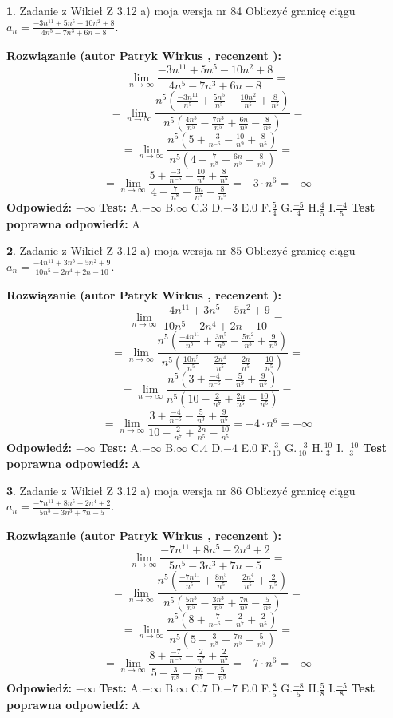 \documentclass[12pt, a4paper]{article}
\theoremstyle{definition} %
\newtheorem{zad}{}
\newcommand{\zadStart}[1]{\begin{zad}#1\newline}
\newcommand{\zadStop}{\end{zad}}
\newcommand{\rozwStart}[2]{\noindent \textbf{Rozwiązanie (autor #1 , recenzent #2): }\newline}
\newcommand{\rozwStop}{\newline}
\newcommand{\odpStart}{\noindent \textbf{Odpowiedź:}\newline}
\newcommand{\odpStop}{\newline}
\newcommand{\testStart}{\noindent \textbf{Test:}\newline}
\newcommand{\testStop}{\newline}
\newcommand{\kluczStart}{\noindent \textbf{Test poprawna odpowiedź:}\newline}
\newcommand{\kluczStop}{\newline}
\begin{document}
\zadStart{Zadanie z Wikieł Z 3.12 a) moja wersja nr 84}
Obliczyć granicę ciągu $a_{n}=\frac{-3n^{11}+5n^{5}-10n^{2}+8}{4n^{5}-7n^{3}+6n-8}$.
\zadStop
\rozwStart{Patryk Wirkus}{}
$$\lim\limits_{n\to\infty}\frac{-3n^{11}+5n^{5}-10n^{2}+8}{4n^{5}-7n^{3}+6n-8}=$$
$$=\lim\limits_{n\to\infty}\frac{n^{5}\left(\frac{-3n^{11}}{n^{5}}+\frac{5n^{5}}{n^{5}}-\frac{10n^{2}}{n^{5}}+\frac{8}{n^{5}}\right)}{n^{5}\left(\frac{4n^{5}}{n^{5}}-\frac{7n^{3}}{n^{5}}+\frac{6n}{n^{5}}-\frac{8}{n^{5}}\right)}=$$
$$=\lim\limits_{n\to\infty}\frac{n^{5}\left(5+\frac{-3}{n^{-6}}-\frac{10}{n^{9}}+\frac{8}{n^{5}}\right)}
{n^{5}\left(4-\frac{7}{n^{8}}+\frac{6n}{n^{5}}-\frac{8}{n^{5}}\right)}=$$
$$=\lim\limits_{n\to\infty}\frac{5+\frac{-3}{n^{-6}}-\frac{10}{n^{9}}+\frac{8}{n^{5}}}{4-\frac{7}{n^{8}}+\frac{6n}{n^{5}}-\frac{8}{n^{5}}}=-3\cdot n^{6} = -\infty$$
\rozwStop
\odpStart
$-\infty$
\odpStop
\testStart
A.$-\infty$
B.$\infty$
C.$3$
D.$-3$
E.$0$
F.$\frac{5}{4}$
G.$\frac{-5}{4}$
H.$\frac{4}{5}$
I.$\frac{-4}{5}$
\testStop
\kluczStart
A
\kluczStop



\zadStart{Zadanie z Wikieł Z 3.12 a) moja wersja nr 85}
Obliczyć granicę ciągu $a_{n}=\frac{-4n^{11}+3n^{5}-5n^{2}+9}{10n^{5}-2n^{4}+2n-10}$.
\zadStop
\rozwStart{Patryk Wirkus}{}
$$\lim\limits_{n\to\infty}\frac{-4n^{11}+3n^{5}-5n^{2}+9}{10n^{5}-2n^{4}+2n-10}=$$
$$=\lim\limits_{n\to\infty}\frac{n^{5}\left(\frac{-4n^{11}}{n^{5}}+\frac{3n^{5}}{n^{5}}-\frac{5n^{2}}{n^{5}}+\frac{9}{n^{5}}\right)}{n^{5}\left(\frac{10n^{5}}{n^{5}}-\frac{2n^{4}}{n^{5}}+\frac{2n}{n^{5}}-\frac{10}{n^{5}}\right)}=$$
$$=\lim\limits_{n\to\infty}\frac{n^{5}\left(3+\frac{-4}{n^{-6}}-\frac{5}{n^{9}}+\frac{9}{n^{5}}\right)}
{n^{5}\left(10-\frac{2}{n^{7}}+\frac{2n}{n^{5}}-\frac{10}{n^{5}}\right)}=$$
$$=\lim\limits_{n\to\infty}\frac{3+\frac{-4}{n^{-6}}-\frac{5}{n^{9}}+\frac{9}{n^{5}}}{10-\frac{2}{n^{7}}+\frac{2n}{n^{5}}-\frac{10}{n^{5}}}=-4\cdot n^{6} = -\infty$$
\rozwStop
\odpStart
$-\infty$
\odpStop
\testStart
A.$-\infty$
B.$\infty$
C.$4$
D.$-4$
E.$0$
F.$\frac{3}{10}$
G.$\frac{-3}{10}$
H.$\frac{10}{3}$
I.$\frac{-10}{3}$
\testStop
\kluczStart
A
\kluczStop



\zadStart{Zadanie z Wikieł Z 3.12 a) moja wersja nr 86}
Obliczyć granicę ciągu $a_{n}=\frac{-7n^{11}+8n^{5}-2n^{4}+2}{5n^{5}-3n^{3}+7n-5}$.
\zadStop
\rozwStart{Patryk Wirkus}{}
$$\lim\limits_{n\to\infty}\frac{-7n^{11}+8n^{5}-2n^{4}+2}{5n^{5}-3n^{3}+7n-5}=$$
$$=\lim\limits_{n\to\infty}\frac{n^{5}\left(\frac{-7n^{11}}{n^{5}}+\frac{8n^{5}}{n^{5}}-\frac{2n^{4}}{n^{5}}+\frac{2}{n^{5}}\right)}{n^{5}\left(\frac{5n^{5}}{n^{5}}-\frac{3n^{3}}{n^{5}}+\frac{7n}{n^{5}}-\frac{5}{n^{5}}\right)}=$$
$$=\lim\limits_{n\to\infty}\frac{n^{5}\left(8+\frac{-7}{n^{-6}}-\frac{2}{n^{7}}+\frac{2}{n^{5}}\right)}
{n^{5}\left(5-\frac{3}{n^{8}}+\frac{7n}{n^{5}}-\frac{5}{n^{5}}\right)}=$$
$$=\lim\limits_{n\to\infty}\frac{8+\frac{-7}{n^{-6}}-\frac{2}{n^{7}}+\frac{2}{n^{5}}}{5-\frac{3}{n^{8}}+\frac{7n}{n^{5}}-\frac{5}{n^{5}}}=-7\cdot n^{6} = -\infty$$
\rozwStop
\odpStart
$-\infty$
\odpStop
\testStart
A.$-\infty$
B.$\infty$
C.$7$
D.$-7$
E.$0$
F.$\frac{8}{5}$
G.$\frac{-8}{5}$
H.$\frac{5}{8}$
I.$\frac{-5}{8}$
\testStop
\kluczStart
A
\kluczStop
\end{document}
